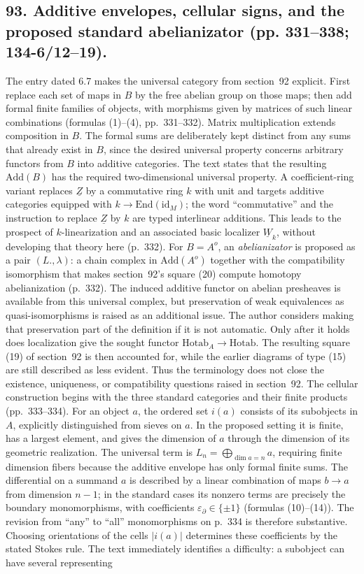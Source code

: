 \documentclass[10pt,oneside]{book}
\begin{document}
\subsection*{93. Additive envelopes, cellular signs, and the proposed standard abelianizator (pp. 331--338; 134-6/12--19).}
The entry dated 6.7 makes the universal category from section~92 explicit. First replace each set of maps in $B$ by the free abelian group on those maps; then add formal finite families of objects, with morphisms given by matrices of such linear combinations (formulas (1)--(4), pp.~331--332). Matrix multiplication extends composition in $B$. The formal sums are deliberately kept distinct from any sums that already exist in $B$, since the desired universal property concerns arbitrary functors from $B$ into additive categories. The text states that the resulting $\mathrm{Add}(B)$ has the required two-dimensional universal property. A coefficient-ring variant replaces $\underline Z$ by a commutative ring $k$ with unit and targets additive categories equipped with $k\to\mathrm{End}(\mathrm{id}_M)$; the word ``commutative'' and the instruction to replace $\underline Z$ by $k$ are typed interlinear additions. This leads to the prospect of $k$-linearization and an associated basic localizer $\underline W_k$, without developing that theory here (p.~332). For $B=A^o$, an \emph{abelianizator} is proposed as a pair $(L.,\lambda)$: a chain complex in $\mathrm{Add}(A^o)$ together with the compatibility isomorphism that makes section~92's square (20) compute homotopy abelianization (p.~332). The induced additive functor on abelian presheaves is available from this universal complex, but preservation of weak equivalences as quasi-isomorphisms is raised as an additional issue. The author considers making that preservation part of the definition if it is not automatic. Only after it holds does localization give the sought functor $\mathrm{Hotab}_A\to\mathrm{Hotab}$. The resulting square (19) of section~92 is then accounted for, while the earlier diagrams of type (15) are still described as less evident. Thus the terminology does not close the existence, uniqueness, or compatibility questions raised in section~92. The cellular construction begins with the three standard categories and their finite products (pp.~333--334). For an object $a$, the ordered set $i(a)$ consists of its subobjects in $A$, explicitly distinguished from sieves on $a$. In the proposed setting it is finite, has a largest element, and gives the dimension of $a$ through the dimension of its geometric realization. The universal term is $L_n=\bigoplus_{\dim a=n}a$, requiring finite dimension fibers because the additive envelope has only formal finite sums. The differential on a summand $a$ is described by a linear combination of maps $b\to a$ from dimension $n-1$; in the standard cases its nonzero terms are precisely the boundary monomorphisms, with coefficients $\varepsilon_{\partial}\in\{\pm1\}$ (formulas (10)--(14)). The revision from ``any'' to ``all'' monomorphisms on p.~334 is therefore substantive. Choosing orientations of the cells $|i(a)|$ determines these coefficients by the stated Stokes rule. The text immediately identifies a difficulty: a subobject can have several representing 
\end{document}
